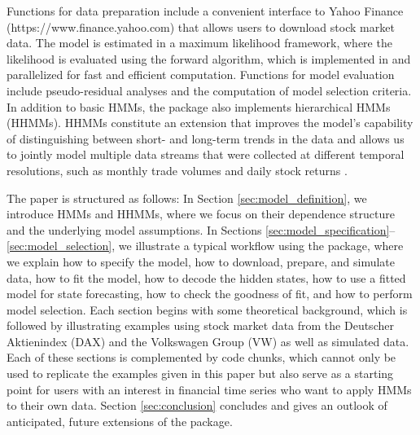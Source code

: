 \documentclass[article]{jss}
\begin{document}
Functions for data preparation include a convenient interface to Yahoo Finance (https://www.finance.yahoo.com) that allows users to download stock market data. The model is estimated in a maximum likelihood framework, where the likelihood is evaluated using the forward algorithm, which is implemented in  and parallelized for fast and efficient computation. Functions for model evaluation include pseudo-residual analyses and the computation of model selection criteria. In addition to basic HMMs, the package also implements hierarchical HMMs (HHMMs). HHMMs \citep{oel21} constitute an extension that improves the model's capability of distinguishing between short- and long-term trends in the data and allows us to jointly model multiple data streams that were collected at different temporal resolutions, such as monthly trade volumes and daily stock returns \citep{ada20}. 

The paper is structured as follows: In Section \ref{sec:model_definition}, we introduce HMMs and HHMMs, where we focus on their dependence structure and the underlying model assumptions. In Sections \ref{sec:model_specification}--\ref{sec:model_selection}, we illustrate a typical workflow using the  package, where we explain how to specify the model, how to download, prepare, and simulate data, how to fit the model, how to decode the hidden states, how to use a fitted model for state forecasting, how to check the goodness of fit, and how to perform model selection. Each section begins with some theoretical background, which is followed by illustrating examples using stock market data from the Deutscher Aktienindex (DAX) and the Volkswagen Group (VW) as well as simulated data. Each of these sections is complemented by code chunks, which cannot only be used to replicate the examples given in this paper but also serve as a starting point for  users with an interest in financial time series who want to apply HMMs to their own data. Section \ref{sec:conclusion} concludes and gives an outlook of anticipated, future extensions of the  package.

\end{document}
